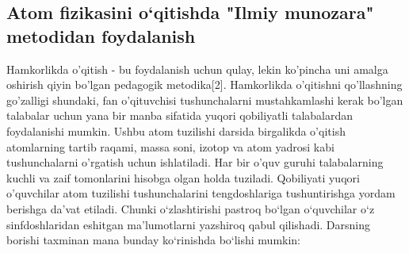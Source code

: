 \documentclass[epsf]{article}
\begin{document}
\subsection{Atom fizikasini o`qitishda "Ilmiy munozara" metodidan foydalanish}
\hspace{0.4cm}
Hamkorlikda o'qitish - bu foydalanish uchun qulay, lekin ko'pincha uni amalga oshirish qiyin bo'lgan pedagogik metodika[2]. Hamkorlikda o'qitishni qo'llashning go'zalligi shundaki, fan o'qituvchisi tushunchalarni mustahkamlashi kerak bo'lgan talabalar uchun yana bir manba sifatida yuqori qobiliyatli talabalardan foydalanishi mumkin. Ushbu atom tuzilishi darsida birgalikda o'qitish atomlarning tartib raqami, massa soni, izotop va atom yadrosi kabi tushunchalarni o'rgatish uchun ishlatiladi. Har bir o'quv guruhi talabalarning kuchli va zaif tomonlarini hisobga olgan holda tuziladi. Qobiliyati yuqori o'quvchilar atom tuzilishi tushunchalarini tengdoshlariga tushuntirishga yordam berishga da'vat etiladi. Chunki o`zlashtirishi pastroq bo`lgan o`quvchilar o`z sinfdoshlaridan eshitgan ma'lumotlarni yazshiroq qabul qilishadi. Darsning borishi taxminan mana bunday ko`rinishda bo`lishi mumkin:
\end{document}
